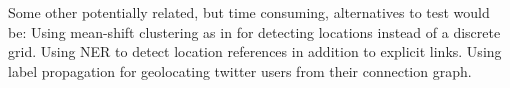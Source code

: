 \documentclass[11pt]{article}
\begin{document}
Some other potentially related, but time consuming, alternatives to test would be:
Using mean-shift clustering as in \cite{Grauman} for detecting locations instead of a discrete grid.
Using NER to detect location references in addition to explicit links.
Using label propagation for geolocating twitter users from their connection graph.




\end{document}
